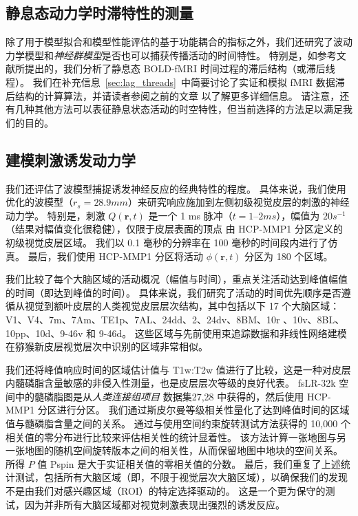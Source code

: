 \documentclass[lang=cn,a4paper,newtx,citestyle=gb7714-2015, bibstyle=gb7714-2015]{elegantpaper}
\begin{document}
\subsection{静息态动力学时滞特性的测量} \label{sec:dynamics_measurement}

除了用于模型拟合和模型性能评估的基于功能耦合的指标之外，我们还研究了波动力学模型和\textit{神经群模型}是否也可以捕获传播活动的时间特性。
特别是，如参考文献\cite{mitra2015lag,mitra2014lag}所提出的，我们分析了静息态 BOLD-fMRI 时间过程的滞后结构（或滞后线程）。
我们在补充信息~\ref{sec:lag_threads}~中简要讨论了实证和模拟 fMRI 数据滞后结构的计算算法，并请读者参阅之前的文章\cite{mitra2015lag,mitra2014lag} 以了解更多详细信息。
请注意，还有几种其他方法可以表征静息状态活动的时空特性\cite{bolt2022parsimonious,cabral2017functional,kashyap2019dynamic}，但当前选择的方法足以满足我们的目的。


\subsection{建模刺激诱发动力学} \label{sec:modelling_stimulus}

我们还评估了波模型捕捉诱发神经反应的经典特性的程度。
具体来说，我们使用优化的波模型（$ r_s = 28.9 mm $）来研究响应施加到左侧初级视觉皮层的刺激的神经动力学。
特别是，刺激 $ Q(\boldsymbol{r},t) $ 是一个 1 ms 脉冲（$ t = 1–2 ms $），幅值为 $ 20 s^{-1} $（结果对幅值变化很稳健），仅限于皮层表面的顶点 由 HCP-MMP1 分区定义的 初级视觉皮层区域。
我们以 0.1 毫秒的分辨率在 100 毫秒的时间段内进行了仿真。 
最后，我们使用 HCP-MMP1 分区将活动 $ \phi(\boldsymbol{r},t) $ 分区为 180 个区域。


我们比较了每个大脑区域的活动概况（幅值与时间），重点关注活动达到峰值幅值的时间（即达到峰值的时间）。
具体来说，我们研究了活动的时间优先顺序是否遵循从视觉到额叶皮层的人类视觉皮层层次结构，其中包括以下 17 个大脑区域：V1、V4、7m、7Am、TE1p、7AL、24dd、2、24dv、8BM、10r 、10v、8BL、10pp、10d、9-46v 和 9-46d。
这些区域与先前使用束追踪数据和非线性网络建模在猕猴新皮层视觉层次中识别的区域非常相似\cite{chaudhuri2015large}。


我们还将峰值响应时间的区域估计值与 T1w:T2w 值进行了比较，这是一种对皮层内髓磷脂含量敏感的非侵入性测量\cite{glasser2011mapping}，也是皮层层次等级\cite{burt2018hierarchy}的良好代表。
fsLR-32k 空间中的髓磷脂图是从\textit{人类连接组项目} 数据集27,28 中获得的，然后使用 HCP-MMP1 分区进行分区。
我们通过斯皮尔曼等级相关性量化了达到峰值时间的区域值与髓磷脂含量之间的关系。
通过与使用空间约束旋转测试方法获得的 10,000 个相关值的零分布进行比较来评估相关性的统计显着性\cite{vavsa2018adolescent,alexander2018testing}。
该方法计算一张地图与另一张地图的随机空间旋转版本之间的相关性，从而保留地图中地块的空间关系。
所得 $ P $ 值 Pspin 是大于实证相关值的零相关值的分数。
最后，我们重复了上述统计测试，包括所有大脑区域（即，不限于视觉层次大脑区域），以确保我们的发现不是由我们对感兴趣区域（ROI）的特定选择驱动的。
这是一个更为保守的测试，因为并非所有大脑区域都对视觉刺激表现出强烈的诱发反应。
\end{document}
